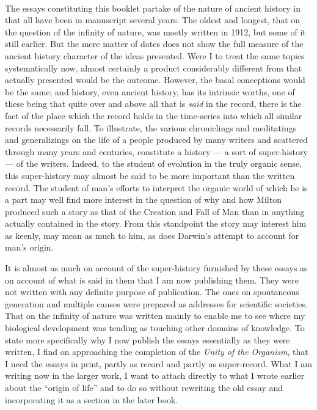 \documentclass[a4paper, 11pt, oneside, polutonikogreek, english]{article}
\begin{document}
\paragraph{}
The essays constituting this booklet partake of the nature of ancient history in that all have been in manuscript several years. The oldest and longest, that on the question of the infinity of nature, was mostly written in 1912, but some of it still earlier. But the mere matter of dates does not show the full measure of the ancient history character of the ideas presented. Were I to treat the same topics systematically now, almost certainly a product considerably different from that actually presented would be the outcome. However, the basal conceptions would be the same; and history, even ancient history, has its intrinsic worths, one of these being that quite over and above all that is \emph{said} in the record, there is the fact of the place which the record holds in the time-series into which all similar records necessarily fall. To illustrate, the various chroniclings and meditatings and generalizings on the life of a people produced by many writers and scattered through many years and centuries, constitute a history --- a sort of super-history --- of the writers. Indeed, to the student of evolution in the truly organic sense, this super-history may almost be said to be more important than the written record. The student of man's efforts to interpret the organic world of which he is a part may well find more interest in the question of why and how Milton produced such a story as that of the Creation and Fall of Man than in anything actually contained in the story. From this standpoint the story may interest him as keenly, may mean as much to him, as does Darwin's attempt to account for man's origin.

It is almost as much on account of the super-history furnished by these essays as on account of what is said in them that I am now publishing them. They were not written with any definite purpose of publication. The ones on spontaneous generation and multiple causes were prepared as addresses for scientific societies. That on the infinity of nature was written mainly to enable me to see where my biological development was tending as touching other domains of knowledge. To state more specifically why I now publish the essays essentially as they were written, I find on approaching the completion of the \emph{Unity of the Organism}, that I need the essays in print, partly as record and partly as super-record. What I am writing now in the larger work, I want to attach directly to what I wrote earlier about the ``origin of life'' and to do so without rewriting the old essay and incorporating it as a section in the later book.
\end{document}
